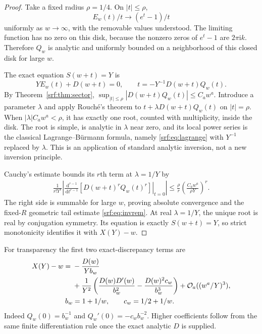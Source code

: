 \documentclass[11pt]{article}
\theoremstyle{remark}\newtheorem{remark}[theorem]{Remark}
\newcommand{\OO}{\mathcal O}
\newcommand{\ii}{\mathrm i}
\newcommand{\dd}{\,\mathrm d}
\begin{document}
\begin{proof}
Take a fixed radius $\rho=1/4$. On $|t|\le\rho$,
\[
 E_w(t)/t\longrightarrow(e^t-1)/t
\]
uniformly as $w\to\infty$, with the removable values understood. The limiting function has no zero on this disk, because the nonzero zeros of $e^t-1$ are $2\pi\ii k$. Therefore $Q_w$ is analytic and uniformly bounded on a neighborhood of this closed disk for large $w$.

The exact equation $S(w+t)=Y$ is
\[
 YE_w(t)+D(w+t)=0,
 \qquad t=-Y^{-1}D(w+t)Q_w(t).
\]
By Theorem~\ref{srf:thm:sector}, $\sup_{|t|\le\rho}|D(w+t)Q_w(t)|\le C_aw^a$. Introduce a parameter $\lambda$ and apply Rouch\'e's theorem to
$t+\lambda D(w+t)Q_w(t)$ on $|t|=\rho$. When $|\lambda|C_aw^a<\rho$, it has exactly one root, counted with multiplicity, inside the disk. The root is simple, is analytic in $\lambda$ near zero, and its local power series is the classical Lagrange--B\"urmann formula, namely \eqref{srf:eq:lagrange} with $Y^{-1}$ replaced by $\lambda$. This is an application of standard analytic inversion, not a new inversion principle.

Cauchy's estimate bounds its $r$th term at $\lambda=1/Y$ by
\begin{align*}
 \frac1{r!Y^r}
 \left|\left.\frac{\dd^{r-1}}{\dd t^{r-1}}
           [D(w+t)^rQ_w(t)^r]\right|_{t=0}\right|
 \le \frac{\rho}{r}
           \left(\frac{C_aw^a}{\rho Y}\right)^r.
\end{align*}
The right side is summable for large $w$, proving absolute convergence and the fixed-$R$ geometric tail estimate \eqref{srf:eq:invrem}. At real $\lambda=1/Y$, the unique root is real by conjugation symmetry. Its equation is exactly $S(w+t)=Y$, so strict monotonicity identifies it with $X(Y)-w$.
\end{proof}

For transparency the first two exact-discrepancy terms are
\begin{align}
 X(Y)-w={}&-\frac{D(w)}{Yb_w}\notag\\
 &+\frac1{Y^2}\left(
       \frac{D(w)D'(w)}{b_w^2}
       -\frac{D(w)^2c_w}{b_w^3}\right)
       +\OO_a((w^a/Y)^3),\label{srf:eq:inv2}\\
 b_w&=1+1/w,\qquad c_w=1/2+1/w.\notag
\end{align}
Indeed $Q_w(0)=b_w^{-1}$ and $Q_w'(0)=-c_wb_w^{-2}$. Higher coefficients follow from the same finite differentiation rule once the exact analytic $D$ is supplied.
\end{document}
